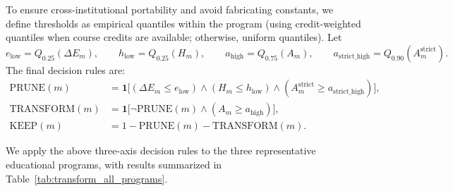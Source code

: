 To ensure cross-institutional portability and avoid fabricating constants, we define thresholds as empirical quantiles within the program (using credit-weighted quantiles when course credits are available; otherwise, uniform quantiles). Let
\begin{equation}
    e_{\mathrm{low}}=Q_{0.25}(\Delta E_m),\qquad
    h_{\mathrm{low}}=Q_{0.25}(H_m),\qquad
    a_{\mathrm{high}}=Q_{0.75}(A_m),\qquad
    a_{\mathrm{strict\_high}}=Q_{0.90}(A_m^{\mathrm{strict}}).
\end{equation}
The final decision rules are:
\begin{align}
    \mathrm{PRUNE}(m) &= \mathbf{1}\Big[(\Delta E_m\le e_{\mathrm{low}})\land(H_m\le h_{\mathrm{low}})\land(A_m^{\mathrm{strict}}\ge a_{\mathrm{strict\_high}})\Big],\\
    \mathrm{TRANSFORM}(m) &= \mathbf{1}\Big[\neg \mathrm{PRUNE}(m)\land(A_m\ge a_{\mathrm{high}})\Big],\\
    \mathrm{KEEP}(m) &= 1-\mathrm{PRUNE}(m)-\mathrm{TRANSFORM}(m).
\end{align}


We apply the above three-axis decision rules to the three representative educational programs, with results summarized in Table~\ref{tab:transform_all_programs}.

